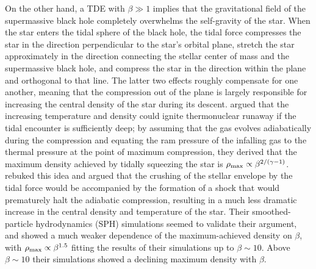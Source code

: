 \documentclass[twocolumn]{aastex62}
\begin{document}
On the other hand, a TDE with $\beta \gg 1$ implies that the gravitational field of the supermassive black hole completely overwhelms the self-gravity of the star. When the star enters the tidal sphere of the black hole, the tidal force compresses the star in the direction perpendicular to the star's orbital plane, stretch the star approximately in the direction connecting the stellar center of mass and the supermassive black hole, and compress the star in the direction within the plane and orthogonal to that line. The latter two effects roughly compensate for one another, meaning that the compression out of the plane is largely responsible for increasing the central density of the star during its descent. \cite{carter83} argued that the increasing temperature and density could ignite thermonuclear runaway if the tidal encounter is sufficiently deep; by assuming that the gas evolves adiabatically during the compression and equating the ram pressure of the infalling gas to the thermal pressure at the point of maximum compression, they derived that the maximum density achieved by tidally squeezing the star is $\rho_{\rm max} \propto \beta^{2/(\gamma-1)}$. \citet{Bicknell:1983aa} rebuked this idea and argued that the crushing of the stellar envelope by the tidal force would be accompanied by the formation of a shock that would prematurely halt the adiabatic compression, resulting in a much less dramatic increase in the central density and temperature of the star. Their smoothed-particle hydrodynamics (SPH) simulations seemed to validate their argument, and showed a much weaker dependence of the maximum-achieved density on $\beta$, with $\rho_{\rm max} \propto \beta^{1.5}$ fitting the results of their simulations up to $\beta \sim 10$. Above $\beta \sim 10$ their simulations showed a declining maximum density with $\beta$. 
\end{document}
